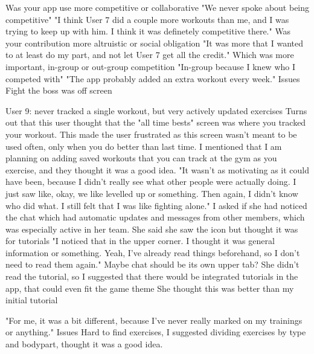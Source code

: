 \documentclass{l4proj}
\begin{document}
  Was your app use more competitive or collaborative
    "We never spoke about being competitive"
    "I think User 7 did a couple more workouts than me, and I was trying to keep up with him. I think it was definetely competitive there."
  Was your contribution more altruistic or social obligation 
    "It was more that I wanted to at least do my part, and not let User 7 get all the credit." 
  Which was more important, in-group or out-group competition
    "In-group because I knew who I competed with"
  "The app probably added an extra workout every week."
  Issues
    Fight the boss was off screen


User 9: never tracked a single workout, but very actively updated exercises
  Turns out that this user thought that the "all time bests" screen was where you tracked your workout. This made the user frustrated as this screen wasn't meant to be used often, only when you do better than last time.
    I mentioned that I am planning on adding saved workouts that you can track at the gym as you exercise, and they thought it was a good idea.
  "It wasn't as motivating as it could have been, because I didn't really see what other people were actually doing. I just saw like, okay, we like levelled up or something. Then again, I didn't know who did what. I still felt that I was like fighting alone."
    I asked if she had noticed the chat which had automatic updates and messages from other members, which was especially active in her team. She said she saw the icon but thought it was for tutorials
      "I noticed that in the upper corner. I thought it was general information or something. Yeah, I've already read things beforehand, so I don't need to read them again."
        Maybe chat should be its own upper tab?
    She didn't read the tutorial, so I suggested that there would be integrated tutorials in the app, that could even fit the game theme
      She thought this was better than my initial tutorial

  "For me, it was a bit different, because I've never really marked on my trainings or anything."
  Issues
     Hard to find exercises, I suggested dividing exercises by type and bodypart, thought it was a good idea.
\end{document}
